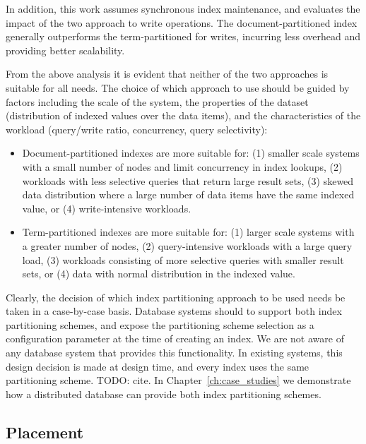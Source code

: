 In addition, this work assumes synchronous index maintenance, and evaluates the impact of the two approach to write
operations.
The document-partitioned index generally outperforms the term-partitioned for writes, incurring less overhead
and providing better scalability.

From the above analysis it is evident that neither of the two approaches is suitable for all needs.
The choice of which approach to use should be guided by factors including the scale of the system, the properties of the
dataset (distribution of indexed values over the data items), and the characteristics of the workload (query/write ratio,
concurrency, query selectivity):
\begin{itemize}

  \item Document-partitioned indexes are more suitable for: (1) smaller scale systems with a small number of nodes and
  limit concurrency in index lookups, (2) workloads with less selective queries that return large result sets, (3)
  skewed data distribution where a large number of data items have the same indexed value, or (4) write-intensive
  workloads.

  \item Term-partitioned indexes are more suitable for: (1) larger scale systems with a greater number of nodes, (2)
  query-intensive workloads with a large query load, (3) workloads consisting of more selective queries with smaller
  result sets, or (4) data with normal distribution in the indexed value.

\end{itemize}

Clearly, the decision of which index partitioning approach to be used needs be taken in a case-by-case basis.
Database systems should to support both index partitioning schemes, and expose the partitioning scheme selection as a
configuration parameter at the time of creating an index.
We are not aware of any database system that provides this functionality.
In existing systems, this design decision is made at design time, and every index uses the same partitioning scheme.
\cite{}
  TODO: cite.
In Chapter~\ref{ch:case_studies} we demonstrate how a distributed database can provide both index partitioning
schemes.



\subsection{Placement}
\label{sec:placement}



